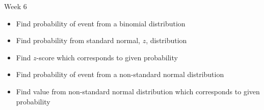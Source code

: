 \documentclass[xcolor=table, aspectratio=169, bigger]{beamer}
\begin{document}
\begin{frame}{Week 6}
\begin{block}{}
\begin{itemize}
\item Find probability of event from a binomial distribution
\item Find probability from standard normal, $z$, distribution
\item Find $z$-score which corresponds to given probability
\item Find probability of event from a non-standard normal distribution
\item Find value from non-standard normal distribution which corresponds to given probability
\end{itemize}
\end{block}
\end{frame}
\end{document}

